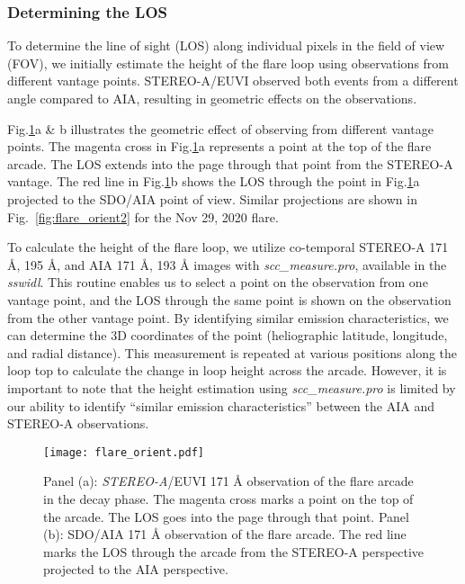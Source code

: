 \subsubsection{Determining the LOS}\label{sec:los}

To determine the line of sight (LOS) along individual pixels in the field of view (FOV), we initially estimate the height of the flare loop using observations from different vantage points. STEREO-A/EUVI observed both events from a different angle compared to AIA, resulting in geometric effects on the observations.

Fig.\ref{fig:flare_orient}a & b illustrates the geometric effect of observing from different vantage points. The magenta cross in Fig.\ref{fig:flare_orient}a represents a point at the top of the flare arcade. The LOS extends into the page through that point from the STEREO-A vantage. The red line in Fig.\ref{fig:flare_orient}b shows the LOS through the point in Fig.\ref{fig:flare_orient}a projected to the SDO/AIA point of view. Similar projections are shown in Fig.~\ref{fig:flare_orient2} for the Nov 29, 2020 flare.

To calculate the height of the flare loop, we utilize co-temporal STEREO-A 171 {\AA}, 195 {\AA}, and AIA 171 {\AA}, 193 {\AA} images with \textit{scc\_measure.pro}, available in the \textit{sswidl}. This routine enables us to select a point on the observation from one vantage point, and the LOS through the same point is shown on the observation from the other vantage point. By identifying similar emission characteristics, we can determine the 3D coordinates of the point (heliographic latitude, longitude, and radial distance). This measurement is repeated at various positions along the loop top to calculate the change in loop height across the arcade. However, it is important to note that the height estimation using \textit{scc\_measure.pro} is limited by our ability to identify ``similar emission characteristics'' between the AIA and STEREO-A observations.

\begin{figure}[ht!]
    \centering
    \texttt{[image: flare\_orient.pdf]}
    \caption{Panel (a): {\it STEREO-A}/EUVI 171 {\AA} observation of the flare arcade in the decay phase. The magenta cross marks a point on the top of the arcade. The LOS goes into the page through that point. Panel (b): SDO/AIA 171 {\AA} observation of the flare arcade. The red line marks the LOS through the arcade from the STEREO-A perspective projected to the AIA perspective.}
    \label{fig:flare_orient}
\end{figure}

